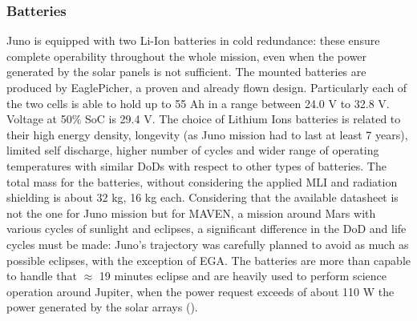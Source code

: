 \subsubsection{Batteries}
\label{subsubsec:Batteries}
Juno is equipped with two Li-Ion batteries in cold redundance: these ensure complete operability throughout the whole mission, even when the power generated by the solar panels is not sufficient.
\mref  
The mounted batteries are produced by EaglePicher, a proven and already flown design\cite{batteries_juno}. Particularly each of the two cells is able to hold up to 55 Ah in a range between 24.0 V to 32.8 V. Voltage at 50\% SoC is 29.4 V.\cite{solar_panels_coef} The choice of Lithium Ions batteries is related to their high energy density, longevity (as Juno mission had to last at least 7 years), limited self discharge, higher number of cycles and wider range of operating temperatures with similar DoDs with respect to other types of batteries.
The total mass for the batteries, without considering the applied MLI and radiation shielding is about 32 kg, 16 kg each. Considering that the available datasheet\cite{batteries_juno} is not the one for Juno mission but for MAVEN, a mission around Mars with various cycles of sunlight and eclipses, a significant difference in the DoD and life cycles must be made: Juno's trajectory was carefully planned to avoid as much as possible eclipses, with the exception of EGA. The batteries are more than capable to handle that $\approx$ 19 minutes eclipse\cite{juno_inner} and are heavily used to perform science operation around Jupiter, when the power request exceeds of about 110 W the power generated by the solar arrays
(\mref).




